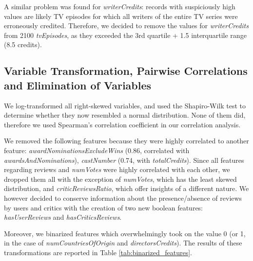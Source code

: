 A similar problem was found for \textit{writerCredits}: records with suspiciously high values are likely TV episodes for which all writers of the entire TV series were erroneously credited.
Therefore, we decided to remove the values for \textit{writerCredits} from 2100 \textit{tvEpisodes}, as they exceeded the 3rd quartile + 1.5 interquartile range (8.5 credits).

\subsection{Variable Transformation, Pairwise Correlations and Elimination of Variables}
We log-transformed all right-skewed variables, and used the Shapiro-Wilk test to determine whether they now resembled a normal distribution. None of them did, therefore we used Spearman's correlation coefficient in our correlation analysis.


We removed the following features because they were highly correlated to another feature: \textit{awardNominationsExcludeWins} (0.86, correlated with \textit{awardsAndNominations}), \textit{castNumber} (0.74, with \textit{totalCredits}).
Since all features regarding reviews and \textit{numVotes} were highly correlated with each other, we dropped them all with the exception of \textit{numVotes}, which has the least skewed distribution, and \textit{criticReviewsRatio}, which offer insights of a different nature. We however decided to conserve information about the presence/absence of reviews by users and critics with the creation of two new boolean features: \textit{hasUserReviews} and \textit{hasCriticsReviews}.

Moreover, we binarized features which overwhelmingly took on the value 0 (or 1, in the case of \textit{numCountriesOfOrigin} and \textit{directorsCredits}). The results of these transformations are reported in Table \ref{tab:binarized_features}.

